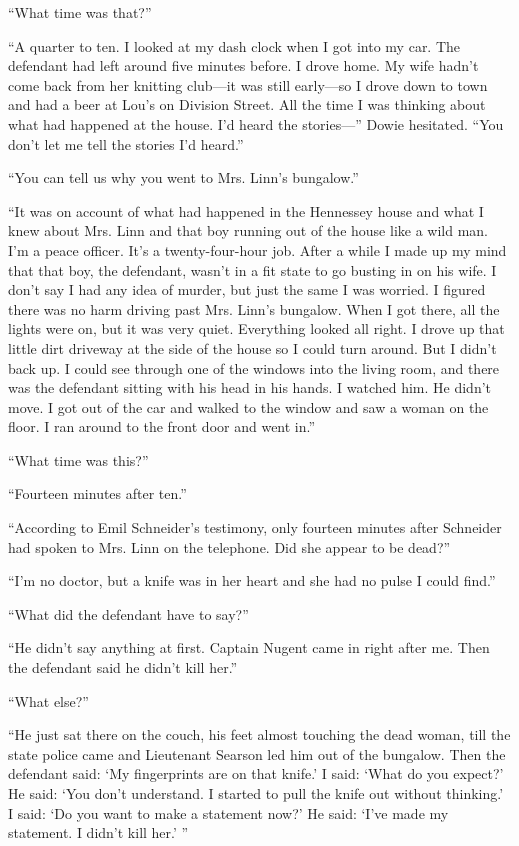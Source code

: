 {“What time was that?”

“A quarter to ten. I looked at my dash clock when I got into my car. The defendant had left around five minutes before. I drove home. My wife hadn’t come back from her knitting club—it was still early—so I drove down to town and had a beer at Lou’s on Division Street. All the time I was thinking about what had happened at the house. I’d heard the stories—” Dowie hesitated. “You don’t let me tell the stories I’d heard.”

“You can tell us why you went to Mrs. Linn’s bungalow.”

“It was on account of what had happened in the Hennessey house and what I knew about Mrs. Linn and that boy running out of the house like a wild man. I’m a peace officer. It’s a twenty-four-hour job. After a while I made up my mind that that boy, the defendant, wasn’t in a fit state to go busting in on his wife. I don’t say I had any idea of murder, but just the same I was worried. I figured there was no harm driving past Mrs. Linn’s bungalow. When I got there, all the lights were on, but it was very quiet. Everything looked all right. I drove up that little dirt driveway at the side of the house so I could turn around. But I didn’t back up. I could see through one of the windows into the living room, and there was the defendant sitting with his head in his hands. I watched him. He didn’t move. I got out of the car and walked to the window and saw a woman on the floor. I ran around to the front door and went in.”

“What time was this?”

“Fourteen minutes after ten.”

“According to Emil Schneider’s testimony, only fourteen minutes after Schneider had spoken to Mrs. Linn on the telephone. Did she appear to be dead?”

“I’m no doctor, but a knife was in her heart and she had no pulse I could find.”

“What did the defendant have to say?”

“He didn’t say anything at first. Captain Nugent came in right after me. Then the defendant said he didn’t kill her.”

“What else?”

“He just sat there on the couch, his feet almost touching the dead woman, till the state police came and Lieutenant Searson led him out of the bungalow. Then the defendant said: ‘My fingerprints are on that knife.’ I said: ‘What do you expect?’ He said: ‘You don’t understand. I started to pull the knife out without thinking.’ I said: ‘Do you want to make a statement now?’ He said: ‘I’ve made my statement. I didn’t kill her.’ ”

}

